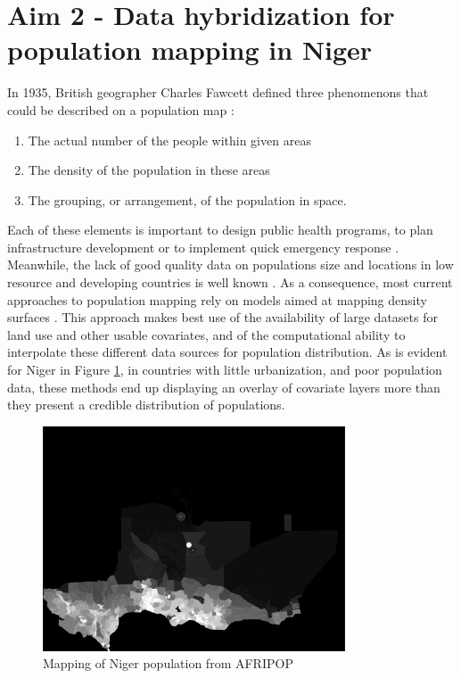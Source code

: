 \section[Data hybridization]{Aim 2 - Data hybridization for population mapping in Niger}

In 1935, British geographer Charles Fawcett defined three phenomenons that could be described on a population map \citep{fawcett_population_1935}:
\begin{enumerate}
	\item The actual number of the people within given areas
	\item The density of the population in these areas
	\item The grouping, or arrangement, of the population in space.
\end{enumerate}

Each of these elements is important to design public health programs, to plan infrastructure development or to implement quick emergency response \citep{bambas_nolen_strengthening_2005,thieren_health_2005}. Meanwhile, the lack of good quality data on populations size and locations in low resource and developing countries is well known \citep{mikkelsen_global_2015}. As a consequence, most current approaches to population mapping rely on models  aimed at mapping density surfaces \citep{linard_population_2012}. This approach makes best use of the availability of large datasets for land use and other usable covariates, and of the computational ability to interpolate these  different data sources for population distribution\citep{stevens_disaggregating_2015}. As is evident for Niger in Figure \ref{AfriPopMap}, in countries with little urbanization, and poor population data, these methods end up displaying an overlay of covariate layers more than they present a credible distribution of populations.

\begin{figure}
	\begin{center}
	\includegraphics[width=0.8\textwidth]{figure/WORLDPOP_Niger.png}
	\caption{Mapping of Niger population from AFRIPOP}
	\label{AfriPopMap}
	\end{center}
\end{figure}

